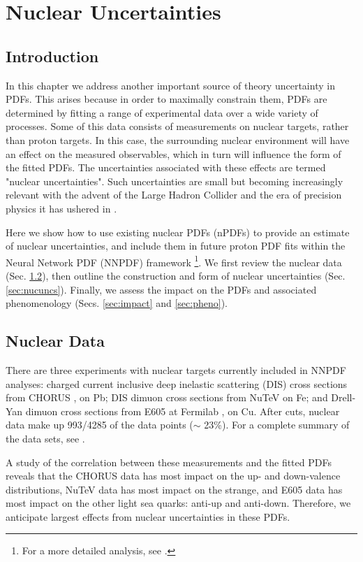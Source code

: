 \chapter{Nuclear Uncertainties}
\section{Introduction}
%
In this chapter we address another important source of theory uncertainty in PDFs. This arises because in order to maximally constrain them, PDFs are determined by fitting a range of experimental data over a wide variety of processes. Some of this data consists of measurements on nuclear targets, rather than proton targets. In this case, the surrounding nuclear environment will have an effect on the measured observables, which in turn will influence the form of the fitted PDFs. The uncertainties associated with these effects are termed "nuclear uncertainties". Such uncertainties are small \cite{Ball:2009mk}\cite{Ball:2013gsa} but becoming increasingly relevant with the advent of the Large Hadron Collider and the era of precision physics it has ushered in \cite{Gao:2017yyd}.

Here we show how to use existing nuclear PDFs (nPDFs) to provide an estimate of nuclear uncertainties, and include them in future proton PDF fits within the Neural Network PDF (NNPDF) framework \cite{Ball:2008by} \footnote{For a more detailed analysis, see \cite{Ball:2018twp}.}. We first review the nuclear data (Sec. \ref{sec:nucdat}), then outline the construction and form of nuclear uncertainties (Sec. \ref{sec:nucuncs}). Finally, we assess the impact on the PDFs and associated phenomenology (Secs. \ref{sec:impact} and \ref{sec:pheno}).
%
\section{Nuclear Data} \label{sec:nucdat}
%
There are three experiments with nuclear targets currently included in NNPDF analyses: 
charged current inclusive deep inelastic scattering (DIS) cross sections from CHORUS \cite{Onengut:2005kv}, on Pb; DIS dimuon cross sections from NuTeV \cite{Goncharov:2001qe}\cite{Tzanov:2005kr} on Fe; and Drell-Yan dimuon cross sections from E605 at Fermilab \cite{Aaltonen:2008eq}, on Cu. After cuts, nuclear data make up 993/4285 of the data points ($\sim$ 23\%). For a complete summary of the data sets, see \cite{Ball:2017nwa}.

A study of the correlation between these measurements and the fitted PDFs reveals that the CHORUS data has most impact on the up- and down-valence distributions, NuTeV data has most impact on the strange, and E605 data has most impact on the other light sea quarks: anti-up and anti-down. Therefore, we anticipate largest effects from nuclear uncertainties in these PDFs.
%
